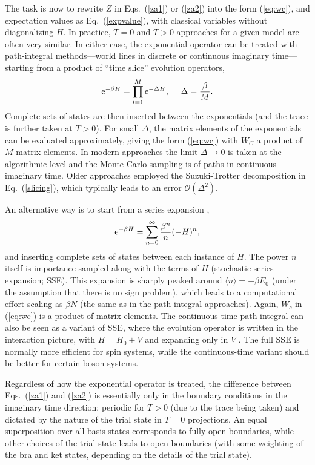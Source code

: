 \documentclass[range]{ar2e}
\begin{document}
The task is now to rewrite $Z$ in Eqs.~(\ref{za1}) or (\ref{za2}) into the form (\ref{eq:wc}), and expectation values as Eq.~(\ref{expvalue}), with classical variables 
without diagonalizing $H$. In practice, $T=0$ and $T>0$ approaches for a given model are often very similar. In either case, the exponential 
operator can be treated with path-integral methods---world lines in discrete \cite{Suzuki77,Hirsch82} or continuous \cite{Beard96,Prokofev96,Prokofev98} 
imaginary time---starting from a product of ``time slice'' evolution operators,
\begin{equation}
{\rm e}^{-\beta H}= \prod_{i=1}^M {\rm e}^{-\Delta H},~~~~ \Delta=\frac{\beta}{M}.
\label{slicing}
\end{equation}
Complete sets of states are then inserted between the exponentials (and the trace is further taken at $T>0$). For small $\Delta$, the
matrix elements of the exponentials can be evaluated approximately, giving the form (\ref{eq:wc}) with $W_C$ a product of $M$ matrix elements. 
In modern approaches the limit $\Delta \to 0$ is taken at the algorithmic level \cite{Prokofev96,WormA,Beard96} and the Monte Carlo sampling is of 
paths in continuous imaginary time. Older approaches employed the Suzuki-Trotter decomposition \cite{Suzuki76} in Eq.~(\ref{slicing}), which 
typically leads to an error $\mathcal{O}(\Delta^2)$.

An alternative way is to start from a series expansion \cite{Handscomb62,Sandvik91},
\begin{equation}
{\rm e}^{-\beta H}= \sum_{n=0}^\infty \frac{\beta^n}{n}(-H)^n,
\label{series}
\end{equation}
and inserting complete sets of states between each instance of $H$. The power $n$ itself is importance-sampled along with the terms of $H$ 
(stochastic series expansion; SSE). This expansion is sharply peaked around $\langle n\rangle = -\beta E_0$ (under the assumption that there 
is no sign problem), which leads to a computational effort scaling as $\beta N$ (the same as in the path-integral approaches). Again, $W_c$ 
in (\ref{eq:wc}) is a product of matrix elements. The continuous-time path integral can also be seen as a variant of SSE, where the evolution
operator is written in the interaction picture, with $H=H_0+V$ and expanding only in $V$ \cite{Prokofev96,Sandvik97a}. The full SSE is normally 
more efficient for spin systems, while the continuous-time variant should be better for certain boson systems.

Regardless of how the exponential operator is treated, the difference between Eqs.~(\ref{za1}) and (\ref{za2}) is essentially only in the boundary 
conditions in the imaginary time direction; periodic for $T>0$ (due to the trace being taken) and dictated by the nature of the trial state in $T=0$ 
projections. An equal superposition over all basis states corresponds to fully open boundaries, while other choices of the trial state leads to open 
boundaries (with some weighting of the bra and ket states, depending on the details of the trial state). 
\end{document}
